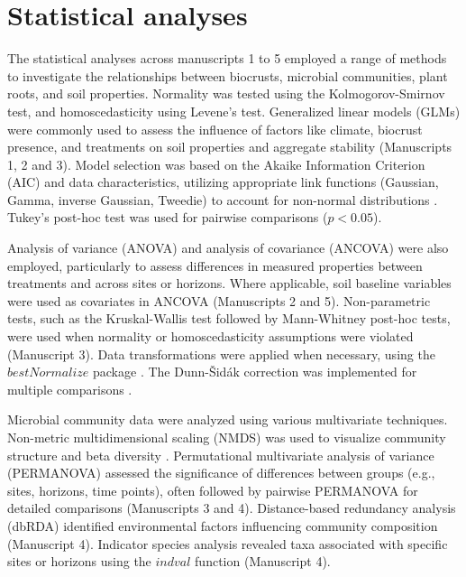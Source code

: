 \section{Statistical analyses}

The statistical analyses across manuscripts 1 to 5 employed a range of methods to investigate the relationships between biocrusts, microbial communities, plant roots, and soil properties. Normality was tested using the Kolmogorov-Smirnov test, and homoscedasticity using Levene's test. Generalized linear models (GLMs) were commonly used to assess the influence of factors like climate, biocrust presence, and treatments on soil properties and aggregate stability (Manuscripts 1, 2 and 3). Model selection was based on the Akaike Information Criterion (AIC) and data characteristics, utilizing appropriate link functions (Gaussian, Gamma, inverse Gaussian, Tweedie) to account for non-normal distributions \citep{Dunn2017,RCoreTeam2018,Wickam2016}. Tukey's post-hoc test was used for pairwise comparisons ($p < 0.05$).

Analysis of variance (ANOVA) and analysis of covariance (ANCOVA) were also employed, particularly to assess differences in measured properties between treatments and across sites or horizons. Where applicable, soil baseline variables were used as covariates in ANCOVA (Manuscripts 2 and 5). Non-parametric tests, such as the Kruskal-Wallis test followed by Mann-Whitney post-hoc tests, were used when normality or homoscedasticity assumptions were violated (Manuscript 3). Data transformations were applied when necessary, using the $bestNormalize$ package \citep{Peterson2021,Peterson2020}. The Dunn-Šidák correction was implemented for multiple comparisons \citep{Hothorn2008}.

Microbial community data were analyzed using various multivariate techniques. Non-metric multidimensional scaling (NMDS) was used to visualize community structure and beta diversity \citep{Oksanen2013}. Permutational multivariate analysis of variance (PERMANOVA) assessed the significance of differences between groups (e.g., sites, horizons, time points), often followed by pairwise PERMANOVA for detailed comparisons \citep{MartinezArbizu2020} (Manuscripts 3 and 4). Distance-based redundancy analysis (dbRDA) identified environmental factors influencing community composition (Manuscript 4). Indicator species analysis revealed taxa associated with specific sites or horizons using the $indval$ function \citep{Dufrene1997,Roberts2016} (Manuscript 4).

